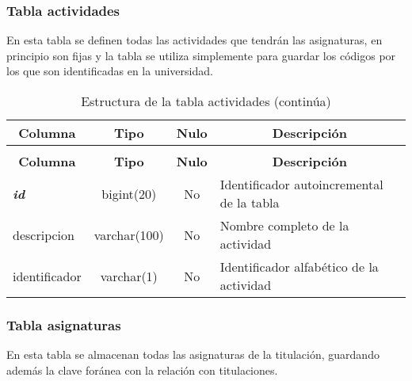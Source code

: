 %
% 
% 

%
%

\subsubsection{Tabla actividades}

En esta tabla se definen todas las actividades que tendrán las asignaturas, en principio son fijas y la tabla se utiliza simplemente para guardar los códigos por los que son identificadas en la universidad.

 \begin{longtable}{|l|c|c|l|} 
 \caption{Estructura de la tabla actividades} \label{tab:actividades-structure} \\
 \hline \multicolumn{1}{|c|}{\textbf{Columna}} & \multicolumn{1}{|c|}{\textbf{Tipo}} & \multicolumn{1}{|c|}{\textbf{Nulo}} & \multicolumn{1}{|c|}{\textbf{Descripción}} \\ \hline \hline
\endfirsthead
 \caption{Estructura de la tabla actividades (continúa)} \\ 
 \hline \multicolumn{1}{|c|}{\textbf{Columna}} & \multicolumn{1}{|c|}{\textbf{Tipo}} & \multicolumn{1}{|c|}{\textbf{Nulo}} & \multicolumn{1}{|c|}{\textbf{Descripción}} \\ \hline \hline \endhead \endfoot 
\textbf{\textit{id}} & bigint(20)  & No & Identificador autoincremental de la tabla  \\ \hline 
descripcion & varchar(100) & No & Nombre completo de la actividad \\ \hline 
identificador & varchar(1) & No & Identificador alfabético de la actividad \\ \hline 
 \end{longtable}

\subsubsection{Tabla asignaturas}

En esta tabla se almacenan todas las asignaturas de la titulación, guardando además la clave foránea con la relación con titulaciones.

